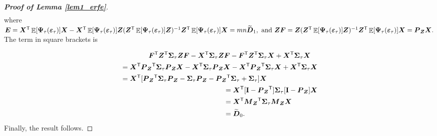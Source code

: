 \documentclass[15pt,a4paper]{article}
\DeclareMathOperator{\E}{\mathbb{E}}
\newcommand{\transpose}{{}^{\text{\sffamily T}}}
\begin{document}
\begin{proof}[\textbf{Proof of Lemma \ref{lem1_erfe}}]
\begin{equation*}
\begin{split}
\end{split}
\end{equation*}
where $\boldsymbol{E}=\boldsymbol{X}\transpose\E[\boldsymbol{\Psi}_{\tau}(\boldsymbol{\varepsilon}_{\tau})]\boldsymbol{X}-\boldsymbol{X}\transpose\E[\boldsymbol{\Psi}_{\tau}(\boldsymbol{\varepsilon}_{\tau})]\boldsymbol{Z}(\boldsymbol{Z}\transpose\E[\boldsymbol{\Psi}_{\tau}(\boldsymbol{\varepsilon}_{\tau})]\boldsymbol{Z})^{-1}\boldsymbol{Z}\transpose\E[\boldsymbol{\Psi}_{\tau}(\boldsymbol{\varepsilon}_{\tau})]
\boldsymbol{X}=mn\widetilde{\boldsymbol{D}}_1, \mbox{ and } \boldsymbol{Z}\boldsymbol{F}=\boldsymbol{Z}(\boldsymbol{Z}\transpose\E[\boldsymbol{\Psi}_{\tau}(\boldsymbol{\varepsilon}_{\tau})]\boldsymbol{Z})^{-1}\boldsymbol{Z}\transpose\E[\boldsymbol{\Psi}_{\tau}(\boldsymbol{\varepsilon}_{\tau})]\boldsymbol{X}=\boldsymbol{P}_{\boldsymbol{Z}}\boldsymbol{X}.$ The term in square brackets is

\begin{align*}
\begin{split}
   {}& \boldsymbol{F}\transpose\boldsymbol{Z}\transpose\boldsymbol{\Sigma}_{\tau}\boldsymbol{Z}\boldsymbol{F}-
 \boldsymbol{X}\transpose\boldsymbol{\Sigma}_{\tau}\boldsymbol{Z}\boldsymbol{F}-\boldsymbol{F}\transpose\boldsymbol{Z}\transpose\boldsymbol{\Sigma}_{\tau}
 \boldsymbol{X}+\boldsymbol{X}\transpose\boldsymbol{\Sigma}_{\tau}\boldsymbol{X}
\end{split}\\
\begin{split}
    {}&= \boldsymbol{X}\transpose\boldsymbol{P}_{\boldsymbol{Z}}\transpose\boldsymbol{\Sigma}_{\tau}\boldsymbol{P}_{\boldsymbol{Z}}
    \boldsymbol{X}- \boldsymbol{X}\transpose\boldsymbol{\Sigma}_{\tau}\boldsymbol{P}_{\boldsymbol{Z}}\boldsymbol{X}
    -\boldsymbol{X}\transpose\boldsymbol{P}_{\boldsymbol{Z}}\transpose\boldsymbol{\Sigma}_{\tau}\boldsymbol{X}  +\boldsymbol{X}\transpose\boldsymbol{\Sigma}_{\tau}\boldsymbol{X}\\     
    & =\boldsymbol{X}\transpose[\boldsymbol{P}_{\boldsymbol{Z}}\transpose\boldsymbol{\Sigma}_{\tau}\boldsymbol{P}_{\boldsymbol{Z}}
     -\boldsymbol{\Sigma}_{\tau}\boldsymbol{P}_{\boldsymbol{Z}} -\boldsymbol{P}_{\boldsymbol{Z}}\transpose\boldsymbol{\Sigma}_{\tau} +\boldsymbol{\Sigma}_{\tau}]\boldsymbol{X}
\end{split}\\
\begin{split}
    {}&= \boldsymbol{X}\transpose[\mathbf{I}-\boldsymbol{P}_{\boldsymbol{Z}}\transpose]\boldsymbol{\Sigma}_{\tau}[\mathbf{I}-
    \boldsymbol{P}_{\boldsymbol{Z}}]\boldsymbol{X}\\    
    & =\boldsymbol{X}\transpose\boldsymbol{M}_{\boldsymbol{Z}}\transpose\boldsymbol{\Sigma}_{\tau}\boldsymbol{M}_{\boldsymbol{Z}}\boldsymbol{X}\\
    &=\widetilde{\boldsymbol{D}}_0.
\end{split}\\
\end{align*}
Finally, the result follows.
\end{proof}
\end{document}
